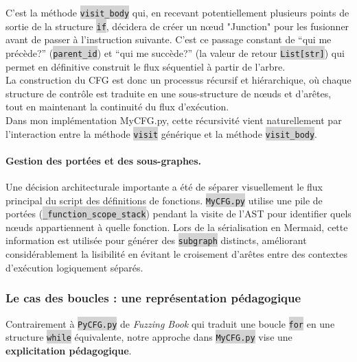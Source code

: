 \documentclass[11pt,a4paper]{article}
\newcommand{\code}[1]{\colorbox{lightgray}{\texttt{\small #1}}}
\begin{document}
C'est la méthode \code{visit\_body} qui, en recevant potentiellement plusieurs points de sortie de la structure \code{if}, décidera de créer un nœud "Junction" pour les fusionner avant de passer à l'instruction suivante. C'est ce passage constant de ``qui me précède?'' (\code{parent\_id}) et ``qui me succède?'' (la valeur de retour \code{List[str]}) qui permet en définitive construit le flux séquentiel à partir de l'arbre.\\
La construction du CFG est donc un processus récursif et hiérarchique, où chaque structure de contrôle est traduite en une sous-structure de nœuds et d'arêtes, tout en maintenant la continuité du flux d'exécution. \\
Dans mon implémentation MyCFG.py, cette récursivité vient naturellement par l'interaction entre la méthode \code{visit} générique et la méthode \code{visit_body}.

\paragraph{Gestion des portées et des sous-graphes.} Une décision architecturale importante a été de séparer visuellement le flux principal du script des définitions de fonctions. \code{MyCFG.py} utilise une pile de portées (\code{\_function\_scope\_stack}) pendant la visite de l'AST pour identifier quels nœuds appartiennent à quelle fonction. Lors de la sérialisation en Mermaid, cette information est utilisée pour générer des \code{subgraph} distincts, améliorant considérablement la lisibilité en évitant le croisement d'arêtes entre des contextes d'exécution logiquement séparés.

\subsubsection{Le cas des boucles : une représentation pédagogique}

Contrairement à \code{PyCFG.py} de \textit{Fuzzing Book} qui traduit une boucle \code{for} en une structure \code{while}
 équivalente, notre approche dans \code{MyCFG.py} vise une \textbf{explicitation pédagogique}.
 
\end{document}
